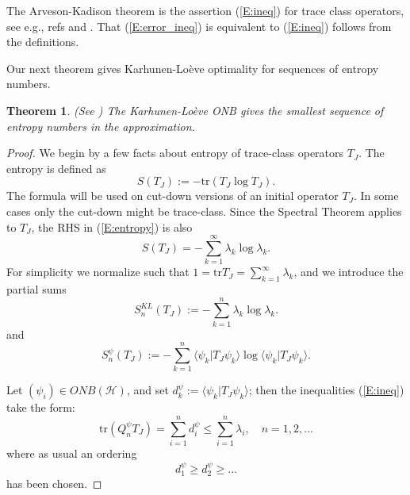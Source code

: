 \documentclass{amsart}
\newtheorem{theorem}{Theorem}[section]
\theoremstyle{definition}
\theoremstyle{remark}
\numberwithin{equation}{section}
\begin{document}
The Arveson-Kadison theorem is the assertion (\ref{E:ineq}) for trace class operators, see e.g., refs \cite{Arv06} and \cite{ArKa06}. That (\ref{E:error_ineq}) is equivalent to (\ref{E:ineq}) follows from the definitions. 

Our next theorem gives Karhunen-Lo\`{e}ve optimality for sequences of entropy
numbers.
\begin{theorem}
\label{T:6.2}
(See \cite{JS07}) The Karhunen-Lo\`{e}ve ONB gives the smallest sequence 
of entropy numbers in the approximation.
\end{theorem}
\begin{proof}
We begin by a few facts about entropy of trace-class operators $T_{J}$.  The entropy
is defined as
\begin{equation}
\label{E:entropy}
S(T_{J}):= -\text{tr}(T_{J}\log{T_{J}}).
\end{equation}
The formula will be used on cut-down versions of an initial operator 
$T_{J}$.  In some cases only the cut-down might be trace-class.
Since the Spectral Theorem applies to $T_{J}$, the RHS in (\ref{E:entropy}) is also
\begin{equation}
\label{E:entropy_sum}
S(T_{J})=-\sum_{k=1}^{\infty}\lambda_{k}\log{\lambda_{k}}.
\end{equation}
For simplicity we normalize such that $1=\text{tr}T_{J}=\sum_{k=1}^{\infty}\lambda_{k}$,
and we introduce the partial sums
\begin{equation}
\label{E:entropy_part_sum1}
S_{n}^{KL}(T_{J}):=-\sum_{k=1}^{n}\lambda_{k}\log{\lambda_{k}}.
\end{equation}
and
\begin{equation}
\label{E:entropy_part_sum2}
S_{n}^{\psi}(T_{J}):=-\sum_{k=1}^{n}\langle \psi_{k}|T_{J}\psi_{k}\rangle 
\log{\langle \psi_{k}|T_{J}\psi_{k}\rangle}.
\end{equation}

Let $(\psi_{i}) \in ONB(\mathcal{H})$, and set 
$d_{k}^{\psi}:=\langle \psi_{k}|T_{J}\psi_{k}\rangle$; then the inequalities 
(\ref{E:ineq}) take the form:
\begin{equation}
\label{E:d_lambda}
  \text{tr}(Q_{n}^{\psi}T_{J})=\sum_{i=1}^{n}d_{i}^{\psi} \leq \sum_{i=1}^{n} \lambda_{i}, \quad n=1,2,...
\end{equation}
where as usual an ordering
\begin{equation}
\label{E:d_order}
d_{1}^{\psi} \geq d_{2}^{\psi} \geq ...
\end{equation}
has been chosen.


\end{proof}
\end{document}
